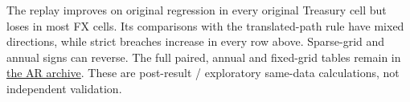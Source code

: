 The replay improves on original regression in every original Treasury
cell but loses in most FX cells. Its comparisons with the translated-path rule
have mixed directions, while strict breaches increase in every row above.
Sparse-grid and annual signs can reverse. The full paired, annual and fixed-grid
tables remain in \href{https://github.com/ByronLi0207/financial-mathematics-paper-20261020/blob/revision-v7-final/results/revision-20261022/ar1-replay/README.md}{the AR archive}.
These are post-result / exploratory same-data calculations, not independent
validation.